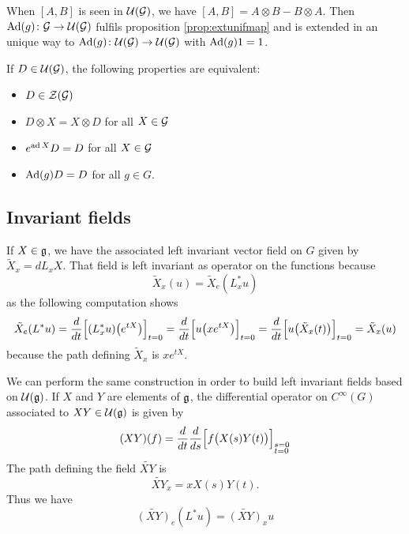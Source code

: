 When $[A,B]$ is seen in $\mU(\mG)$, we have $[A,B]=A\otimes B-B\otimes A$. Then $\dpt{ \Ad(g) }{ \mG }{ \mU(\mG) }$ fulfils proposition \ref{prop:extunifmap} and is extended in an unique way to $\dpt{ \Ad(g) }{ \mU(\mG) }{ \mU(\mG) }$ with $\Ad(g)1=1$.
 
\begin{lemma} 
    If $D\in\mU(\mG)$, the following properties are equivalent:
    \begin{itemize}
        \item $D\in\mZ(\mG)$
        \item $D\otimes X=X\otimes D$ for all $X\in \mG$
        \item $e^{\ad X}D=D$ for all $X\in\mG$
        \item $\Ad(g)D=D$ for all $g\in G$.
    \end{itemize}
     \label{lem:equivDAd}
\end{lemma}

\subsection{Invariant fields}

If $X\in\lG$, we have the associated left invariant vector field on $G$ given by $\tilde X_x=dL_xX$. That field is left invariant as operator on the functions because
\begin{equation}
    \tilde X_x(u)=\tilde X_e(L^*_xu)
\end{equation}
as the following computation shows
\begin{equation}
        \tilde X_e(L^*u)=\Dsdd{ (L_x^*u)\big(  e^{tX} \big) }{t}{0}
        =\Dsdd{ u\big( x e^{tX} \big) }{t}{0}
        =\Dsdd{ u\big( \tilde X_x(t) \big) }{t}{0}
        =\tilde X_x(u)
\end{equation}
because the path defining $\tilde X_x$ is $x e^{tX}$.

We can perform the same construction in order to build left invariant fields based on $\mU(\lG)$. If $X$ and $Y$ are elements of $\lG$, the  differential operator on $ C^{\infty}(G)$ associated to $XY\in\mU(\lG)$ is given by
\begin{equation}
    (XY)(f)=\DDsdd{ f\big( X(s)Y(t) \big) }{t}{0}{s}{0}
\end{equation}
The path defining the field $\widetilde{XY}$ is
\begin{equation}
    \widetilde{XY}_x=xX(s)Y(t).
\end{equation}
Thus we have
\begin{equation}        \label{EqInvarUgField}
    \widetilde{(XY)}_e(L^*u)=\widetilde{(XY)}_xu
\end{equation}

